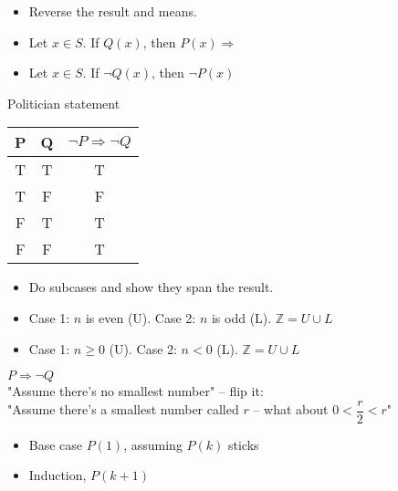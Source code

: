 \documentclass[english,10pt,a4paper]{article}
\begin{document}
\begin{theo} 
\begin{minipage}{0.75\linewidth}
\begin{itemize}
\item Reverse the result and means.
\item Let $x \in S$. If $Q(x)$, then $P(x) \Rightarrow$
\item[] Let $x \in S$. If $\neg Q(x)$, then $\neg P(x)$
\end{itemize}
\end{minipage}
\hspace{0.1cm}
\begin{minipage}{0.2\linewidth}
Politician statement
\begin{tabular}{cc|c}
P & Q & $\neg P \Rightarrow \neg Q$\\ 
\hline
T & T & T \\ 
T & F & F\\
F & T & T\\
F & F & T
\end{tabular} 

\end{minipage}
\end{theo}



\begin{theo} 
\begin{itemize}
\item Do subcases and show they span the result.
\item Case 1: $n$ is even (U). Case 2: $n$ is odd (L). $\mathbb{Z} = U \cup L $
\item Case 1: $n\geq0$ (U). Case 2: $n<0$ (L). $\mathbb{Z} = U \cup L$
\end{itemize}
\end{theo}


\begin{theo}[Contradiction] 
 $P \Rightarrow \neg Q$\\
"Assume there's no smallest number" -- flip it:\\
"Assume there's a smallest number called $r$ -- what about $0 < \dfrac{r}{2} < r$"
\end{theo}


\begin{theo}[Induction] 
\begin{itemize}
\item Base case $P(1)$, assuming $P(k)$ sticks
\item Induction, $P(k+1)$
\end{itemize}
\end{theo}
\end{document}
